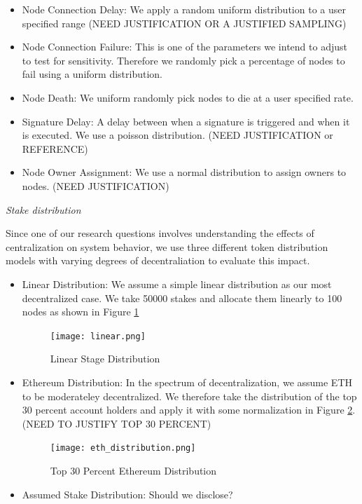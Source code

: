 \documentclass[conference]{IEEEtran}
\begin{document}
\begin{itemize}

\item Node Connection Delay: We apply a random uniform distribution to a user specified range (NEED JUSTIFICATION OR A JUSTIFIED SAMPLING)
\item Node Connection Failure: This is one of the parameters we intend to adjust to test for sensitivity. Therefore we
randomly pick a percentage of nodes to fail using a uniform distribution.
\item Node Death: We uniform randomly pick nodes to die at a user specified rate.
\item Signature Delay: A delay between when a signature is triggered and when it is executed. We use a poisson distribution. (NEED JUSTIFICATION or REFERENCE)
\item Node Owner Assignment: We use a normal distribution to assign owners to nodes. (NEED JUSTIFICATION)
\end{itemize}

\textit{Stake distribution} 

Since one of our research questions involves understanding the effects of centralization
on system behavior, we use three different token distribution models with 
varying degrees of decentraliation to evaluate this impact. 

\begin{itemize}
\item Linear Distribution: We assume a simple linear distribution as our most 
decentralized case. We take 50000 stakes and allocate them linearly to 100 nodes
as shown in Figure \ref{fig:linear_distribution}

\begin{figure}
    \texttt{[image: linear.png]}
    \caption{Linear Stage Distribution}
    \label{fig:linear_distribution}
\end{figure}

\item Ethereum Distribution: In the spectrum of decentralization, we assume 
ETH to be moderateley decentralized. We therefore take the distribution of the 
top 30 percent account holders and apply it with some normalization in Figure \ref{fig:eth_distribution}.
(NEED TO JUSTIFY TOP 30 PERCENT)

\begin{figure}
    \texttt{[image: eth\_distribution.png]}
    \caption{Top 30 Percent Ethereum Distribution}
    \label{fig:eth_distribution}
\end{figure}

\item Assumed Stake Distribution: Should we disclose?
\end{itemize}
\end{document}
